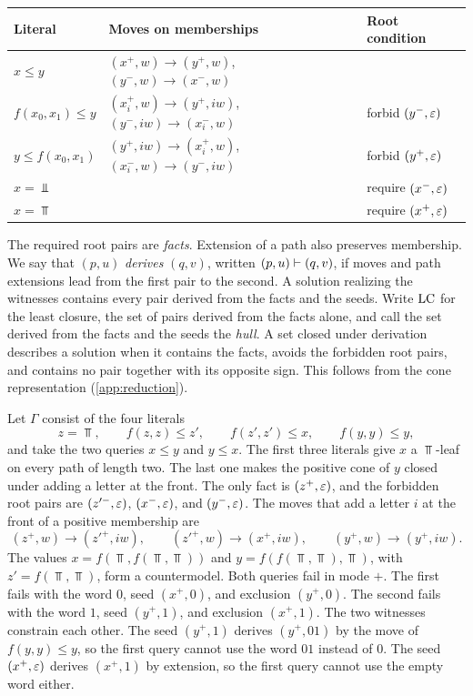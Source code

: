 \begin{center}
\small
\begin{tabular}{@{}lll@{}}
\toprule
Literal & Moves on memberships & Root condition\\
\midrule
$x\le y$ &
$(x^+,w)\to(y^+,w)$,\quad $(y^-,w)\to(x^-,w)$ &\\
$f(x_0,x_1)\le y$ &
$(x_i^+,w)\to(y^+,iw)$,\quad $(y^-,iw)\to(x_i^-,w)$ &
forbid $(y^-,\varepsilon)$\\
$y\le f(x_0,x_1)$ &
$(y^+,iw)\to(x_i^+,w)$,\quad $(x_i^-,w)\to(y^-,iw)$ &
forbid $(y^+,\varepsilon)$\\
$x=\Bot$ & & require $(x^-,\varepsilon)$\\
$x=\Top$ & & require $(x^+,\varepsilon)$\\
\bottomrule
\end{tabular}
\end{center}

The required root pairs are \emph{facts}. Extension of a path also
preserves membership. We say that $(p,u)$ \emph{derives} $(q,v)$, written
$(p,u)\vdash(q,v)$, if moves and path extensions lead from the first pair to
the second. A solution realizing the witnesses contains every pair derived
from the facts and the seeds. Write $\mathrm{LC}$ for the least closure, the set of
pairs derived from the facts alone, and call the set derived from the facts
and the seeds the \emph{hull}. A set closed under derivation describes a
solution when it contains the facts, avoids the forbidden root pairs, and
contains no pair together with its opposite sign. This follows from the
cone representation (\cref{app:reduction}).

\begin{example}\label{ex:comparable}
Let $\Gamma$ consist of the four literals
\[
  z=\Top,\qquad f(z,z)\le z',\qquad f(z',z')\le x,\qquad f(y,y)\le y,
\]
and take the two queries $x\le y$ and $y\le x$. The first three literals
give $x$ a $\Top$-leaf on every path of length two. The last one makes the
positive cone of $y$ closed under adding a letter at the front. The only
fact is $(z^+,\varepsilon)$, and the forbidden root pairs are $(z'^-,\varepsilon)$,
$(x^-,\varepsilon)$, and $(y^-,\varepsilon)$. The moves that add a letter $i$ at the
front of a positive membership are
\[
  (z^+,w)\to(z'^+,iw),\qquad (z'^+,w)\to(x^+,iw),\qquad (y^+,w)\to(y^+,iw).
\]
The values $x=f(\Top,f(\Top,\Top))$ and $y=f(f(\Top,\Top),\Top)$, with
$z'=f(\Top,\Top)$, form a countermodel. Both queries fail in mode $+$.
The first fails with the word $0$, seed $(x^+,0)$, and exclusion $(y^+,0)$.
The second fails with the word $1$, seed $(y^+,1)$, and exclusion
$(x^+,1)$. The two witnesses constrain each other. The seed $(y^+,1)$
derives $(y^+,01)$ by the move of $f(y,y)\le y$, so the first query cannot
use the word $01$ instead of $0$. The seed $(x^+,\varepsilon)$ derives $(x^+,1)$
by extension, so the first query cannot use the empty word either.
\end{example}

